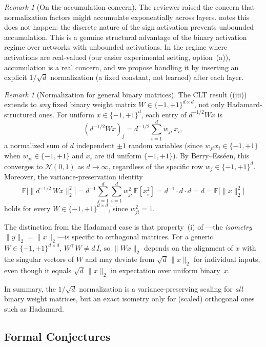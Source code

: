 \documentclass[12pt,a4paper]{article}
\theoremstyle{plain}
\theoremstyle{definition}
\theoremstyle{remark}
\newtheorem{remark}[theorem]{Remark}
\newcommand{\E}{\mathbb{E}}
\newcommand{\pmone}{\{-1,+1\}}
\begin{document}
\begin{remark}[On the accumulation concern]
The reviewer raised the concern that normalization factors might accumulate exponentially across layers.  notes this does not happen: the discrete nature of the sign activation prevents unbounded accumulation. This is a genuine structural advantage of the binary activation regime over networks with unbounded activations. In the regime where activations are real-valued (our easier experimental setting,  option~(a)), accumulation is a real concern, and we propose handling it by inserting an explicit $1/\sqrt{d}$ normalization (a fixed constant, not learned) after each layer.
\end{remark}

\begin{remark}[Normalization for general binary matrices]\label{rem:general-binary-norm}
The CLT result ((iii)) extends to \emph{any} fixed binary weight matrix $W \in \pmone^{d \times d}$, not only Hadamard-structured ones. For uniform $x \in \pmone^d$, each entry of $d^{-1/2} Wx$ is
\[
    (d^{-1/2} Wx)_j = d^{-1/2} \sum_{i=1}^{d} w_{ji}\, x_i,
\]
a normalized sum of $d$ independent $\pm 1$ random variables (since $w_{ji} x_i \in \pmone$ when $w_{ji} \in \pmone$ and $x_i$ are iid uniform $\pmone$). By Berry--Ess\'een, this converges to $\mathcal{N}(0,1)$ as $d \to \infty$, regardless of the specific row $w_j \in \pmone^d$. Moreover, the variance-preservation identity
\[
    \E\bigl[\|d^{-1/2}\, Wx\|_2^2\bigr] = d^{-1} \sum_{j=1}^{d} \sum_{i=1}^{d} w_{ji}^2\, \E[x_i^2] = d^{-1} \cdot d \cdot d = d = \E\bigl[\|x\|_2^2\bigr]
\]
holds for every $W \in \pmone^{d \times d}$, since $w_{ji}^2 = 1$.

The distinction from the Hadamard case is that property~(i) of ---the \emph{isometry} $\|y\|_2 = \|x\|_2$---is specific to orthogonal matrices. For a generic $W \in \pmone^{d \times d}$, $W^\top W \neq d\,I$, so $\|Wx\|_2$ depends on the alignment of $x$ with the singular vectors of $W$ and may deviate from $\sqrt{d}\,\|x\|_2$ for individual inputs, even though it equals $\sqrt{d}\,\|x\|_2$ in expectation over uniform binary~$x$.

In summary, the $1/\sqrt{d}$ normalization is a variance-preserving scaling for \emph{all} binary weight matrices, but an exact isometry only for (scaled) orthogonal ones such as Hadamard.
\end{remark}


\subsection{Formal Conjectures}\label{sec:conjectures}
\end{document}
